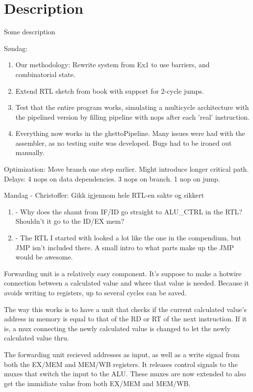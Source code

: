 \section{Description}

Some description

Søndag:

\begin{enumerate}
  \item Our methodology: Rewrite system from Ex1 to use barriers, and combinatorial state.
  \item Extend RTL sketch from book with support for 2-cycle jumps.
  \item Test that the entire program works, simulating a multicycle architecture with the pipelined version by filling pipeline with nops after each 'real' instruction.
  \item Everything now works in the ghettoPipeline. Many issues were had with the assembler, as no testing suite was developed. Bugs had to be ironed out manually.
\end{enumerate}

Optimization: Move branch one step earlier. Might introduce longer critical path.
Delays: 4 nops on data dependencies. 3 nops on branch. 1 nop on jump.


Mandag - Christoffer:
Gikk igjennom hele RTL-en sakte og sikkert
\begin{enumerate}
    \item - Why does the shamt from IF/ID go straight to ALU\_CTRL in the RTL? Shouldn't it go to the ID/EX mem?
    \item - The RTL I started with looked a lot like the one in the compendium, but JMP isn't included there.
    A small intro to what parts make up the JMP would be awesome.
\end{enumerate}

Forwarding unit is a relatively easy component.
It's suppose to make a hotwire connection between a calculated value and where that value is needed.
Because it avoids writing to registers, up to several cycles can be saved.

The way this works is to have a unit that checks if the current calculated value's address in memory
is equal to that of the RD or RT of the next instruction.
If it is, a mux connecting the newly calculated value is changed to let the newly calculated value thru.

The forwarding unit recieved addresses as input, as well as a write signal from both
the EX/MEM and MEM/WB registers.
It releases control signals to the muxes that switch the input to the ALU.
These muxes are now extended to also get the immidiate value from both EX/MEM and MEM/WB.

